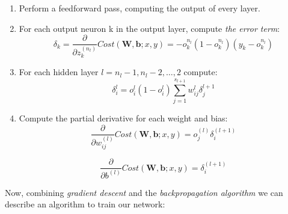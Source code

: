 \begin{enumerate}
	\item Perform a feedforward pass, computing the output of every layer.
	\item For each output neuron k in the output layer, compute \textit{the error term}: 
	\begin{equation}
		\delta_k = \frac{\partial}{\partial z_{k}^{(n_l)} }Cost(\mathbf{W,b}; x, y) = -o_k^{n_l}(1-o_k^{n_l})(y_k-o_k^{n_l})
	\end{equation} 
	\item For each hidden layer $ l = n_l - 1, n_l - 2,\dots, 2 $ compute: 
	\begin{equation}
		\delta_i^{l} = o_i^l(1-o_i^l)\sum_{j=1}^{s_{l+1}} w_{ij}^l \delta_j^{l+1} 
	\end{equation}
	\item Compute the partial derivative for each weight and bias:
	\begin{equation}
		\frac{\partial}{\partial w_{ij}^{(l)} }Cost(\mathbf{W,b}; x, y) = o_j^{(l)}\delta_i^{(l+1)}
	\end{equation}
	
	\begin{equation}
		\frac{\partial}{\partial b^{(l)} }Cost(\mathbf{W,b}; x, y) = \delta_i^{(l+1)}
	\end{equation}
\end{enumerate}
	
Now, combining \textit{gradient descent} and the \textit{backpropagation algorithm} we can describe an algorithm to train our network: 

